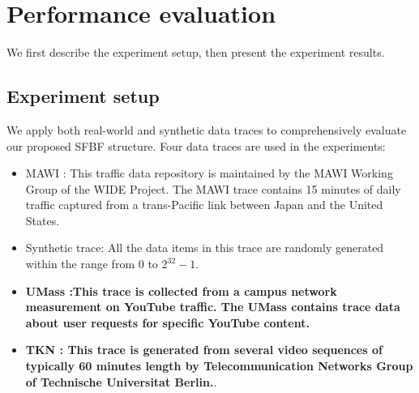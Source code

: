 \documentclass[10pt,journal,compsoc]{IEEEtran}
\begin{document}
\section{Performance evaluation}
\label{sec:simulation}
We first describe the experiment setup, then present the experiment results.
\subsection{Experiment setup}
We apply both real-world and synthetic data traces to comprehensively evaluate our proposed SFBF structure. Four data traces are used in the experiments:

\begin{itemize}
  \item MAWI \cite{MAWI}: This traffic data repository is maintained by the MAWI Working Group of the WIDE Project. The MAWI trace  contains 15 minutes of daily traffic captured from a trans-Pacific link between Japan and the United States. %
  \item Synthetic trace: All the data items in this trace are randomly generated within the range from 0 to $2^{32}-1$.
  \item \textbf{UMass \cite{UMass}:This trace is collected from a campus network measurement on YouTube traffic. The UMass contains trace data about user requests for specific YouTube content.}
  \item \textbf{TKN \cite{TKN}: This trace is generated from several video sequences of typically 60 minutes length by Telecommunication Networks Group of Technische Universitat Berlin.}.
\end{itemize}
\end{document}
